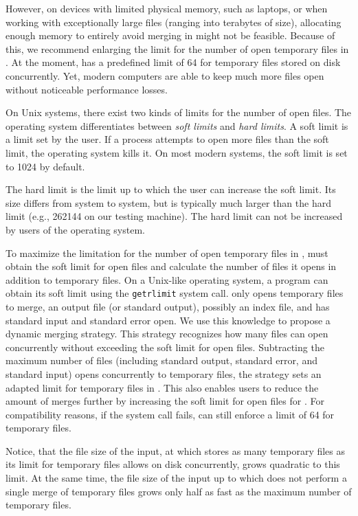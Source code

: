 However, on devices with limited physical memory, such as laptops, or when working with exceptionally large files (ranging into terabytes of size), allocating enough memory to entirely avoid merging in \sort might not be feasible. Because of this, we recommend enlarging the limit for the number of open temporary files in \sort. At the moment, \sort has a predefined limit of 64 for temporary files stored on disk concurrently. Yet, modern computers are able to keep much more files open without noticeable performance losses. 

\label{limits} On Unix systems, there exist two kinds of limits for the number of open files. The operating system differentiates between \textit{soft limits} and \textit{hard limits}.
A soft limit is a limit set by the user. If a process attempts to open more files than the soft limit, the operating system kills it. On most modern systems, the soft limit is set to 1024 by default. 

The hard limit is the limit up to which the user can increase the soft limit. Its size differs from system to system, but is typically much larger than the hard limit (e.g., 262144 on our testing machine). The hard limit can not be increased by users of the operating system. 

To maximize the limitation for the number of open temporary files in \sort, \sort must obtain the soft limit for open files and calculate the number of files it opens in addition to temporary files.
On a Unix-like operating system, a program can obtain its soft limit using the \texttt{getrlimit} \cite{noauthor_getrlimit2_nodate} system call. \sort only opens temporary files to merge, an output file (or standard output), possibly an index file, and has standard input and standard error open. We use this knowledge to propose a dynamic merging strategy. This strategy recognizes how many files \sort can open concurrently without exceeding the soft limit for open files. Subtracting the maximum number of files (including standard output, standard error, and standard input) \sort opens concurrently to temporary files, the strategy sets an adapted limit for temporary files in \sort. This also enables users to reduce the amount of merges further by increasing the soft limit for open files for \sort. For compatibility reasons, if the system call fails, \sort can still enforce a limit of 64 for temporary files.
 

Notice, that the file size of the input, at which \sort stores as many temporary files as its limit for temporary files allows on disk concurrently, grows quadratic to this limit. At the same time, the file size of the input up to which \sort does not perform a single merge of temporary files grows only half as fast as the maximum number of temporary files.

